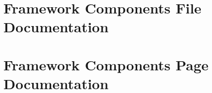 \documentclass[letterpaper]{article}
\begin{document}
\section{Framework Components File Documentation}











\section{Framework Components Page Documentation}

\printindex
\end{document}
